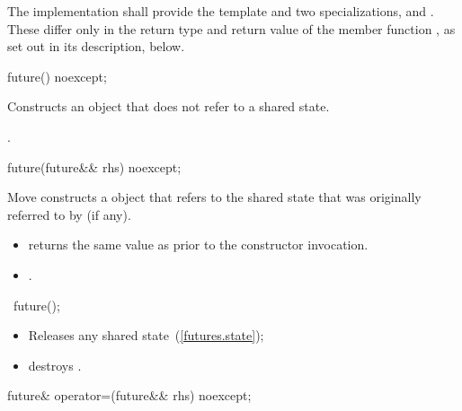 \pnum
The implementation shall provide the template  and two specializations,
 and . These differ only in the return type and return
value of the member function , as set out in its description, below.

%
\begin{itemdecl}
future() noexcept;
\end{itemdecl}

\begin{itemdescr}
\pnum
\effects Constructs an 
 object that does not refer to a
shared state.

\pnum
\postcondition {}.
\end{itemdescr}

%
\begin{itemdecl}
future(future&& rhs) noexcept;
\end{itemdecl}

\begin{itemdescr}
\pnum
\effects Move constructs a  object that refers to the shared
state that
was originally referred to by  (if any).

\pnum
\postconditions
\begin{itemize}
\item {} returns the same value as  prior to the
constructor invocation.
\item {}.
\end{itemize}
\end{itemdescr}

%
\begin{itemdecl}
~future();
\end{itemdecl}

\begin{itemdescr}
\pnum
\effects
\begin{itemize}
\item
Releases any shared state~(\ref{futures.state});
\item
destroys .
\end{itemize}
\end{itemdescr}

%
%
\begin{itemdecl}
future& operator=(future&& rhs) noexcept;
\end{itemdecl}

